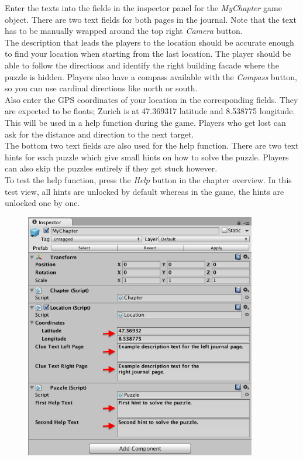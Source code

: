 \documentclass[a4paper]{article}
\begin{document}
Enter the texts into the fields in the inspector panel for the \textit{MyChapter} game object. There are two text fields for both pages in the journal. Note that the text has to be manually wrapped around the top right \textit{Camera} button.\\
	
The description that leads the players to the location should be accurate enough to find your location when starting from the last location. The player should be able to follow the directions and identify the right building facade where the puzzle is hidden. Players also have a compass available with the \textit{Compass} button, so you can use cardinal directions like north or south.\\
	
Also enter the GPS coordinates of your location in the corresponding fields. They are expected to be floats; Zurich is at 47.369317 latitude and 8.538775 longitude. This will be used in a help function during the game. Players who get lost can ask for the distance and direction to the next target.\\
	
The bottom two text fields are also used for the help function. There are two text hints for each puzzle which give small hints on how to solve the puzzle. Players can also skip the puzzles entirely if they get stuck however.\\
	
To test the help function, press the \textit{Help} button in the chapter overview. In this test view, all hints are unlocked by default whereas in the game, the hints are unlocked one by one.\\

\begin{figure}[H]
\centering
\includegraphics[width=0.9\textwidth]{figures/2-2.png}
\end{figure}
\end{document}
